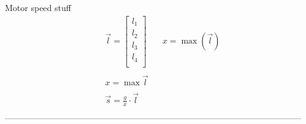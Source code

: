 \documentclass{article}
\begin{document}
Motor speed stuff
\begin{equation}\label{motor_speed_equation}
\begin{aligned}
&\vec{l} = \begin{bmatrix}
l_1\\l_2\\l_3\\l_4\\
\end{bmatrix}\quad
&x = \max\left(\vec{l}\right)\\\\
&x = \max\vec{l}\\\\
&\vec{s} = \frac{g}{x}\cdot \vec{l}\\
\end{aligned}
\end{equation}
--------------------------------------------------------------------------------------------------------\\









%
\end{document}
